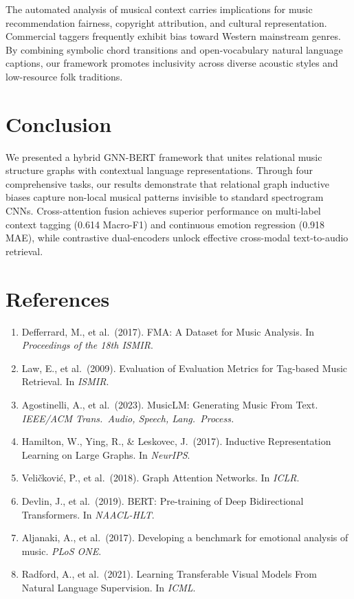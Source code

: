 \documentclass[10pt]{article}
\begin{document}
The automated analysis of musical context carries implications for music recommendation fairness, copyright attribution, and cultural representation. Commercial taggers frequently exhibit bias toward Western mainstream genres. By combining symbolic chord transitions and open-vocabulary natural language captions, our framework promotes inclusivity across diverse acoustic styles and low-resource folk traditions.

\section{Conclusion}

We presented a hybrid GNN-BERT framework that unites relational music structure graphs with contextual language representations. Through four comprehensive tasks, our results demonstrate that relational graph inductive biases capture non-local musical patterns invisible to standard spectrogram CNNs. Cross-attention fusion achieves superior performance on multi-label context tagging (0.614 Macro-F1) and continuous emotion regression (0.918 MAE), while contrastive dual-encoders unlock effective cross-modal text-to-audio retrieval.

\section*{References}

{\small
\begin{enumerate}[nosep,leftmargin=1.6em]
  \item Defferrard, M., et al.\ (2017). FMA: A Dataset for Music Analysis. In \textit{Proceedings of the 18th ISMIR}.
  \item Law, E., et al.\ (2009). Evaluation of Evaluation Metrics for Tag-based Music Retrieval. In \textit{ISMIR}.
  \item Agostinelli, A., et al.\ (2023). MusicLM: Generating Music From Text. \textit{IEEE/ACM Trans.\ Audio, Speech, Lang.\ Process.}
  \item Hamilton, W., Ying, R., \& Leskovec, J.\ (2017). Inductive Representation Learning on Large Graphs. In \textit{NeurIPS}.
  \item Veli\v{c}kovi\'{c}, P., et al.\ (2018). Graph Attention Networks. In \textit{ICLR}.
  \item Devlin, J., et al.\ (2019). BERT: Pre-training of Deep Bidirectional Transformers. In \textit{NAACL-HLT}.
  \item Aljanaki, A., et al.\ (2017). Developing a benchmark for emotional analysis of music. \textit{PLoS ONE}.
  \item Radford, A., et al.\ (2021). Learning Transferable Visual Models From Natural Language Supervision. In \textit{ICML}.
\end{enumerate}
}
\end{document}
